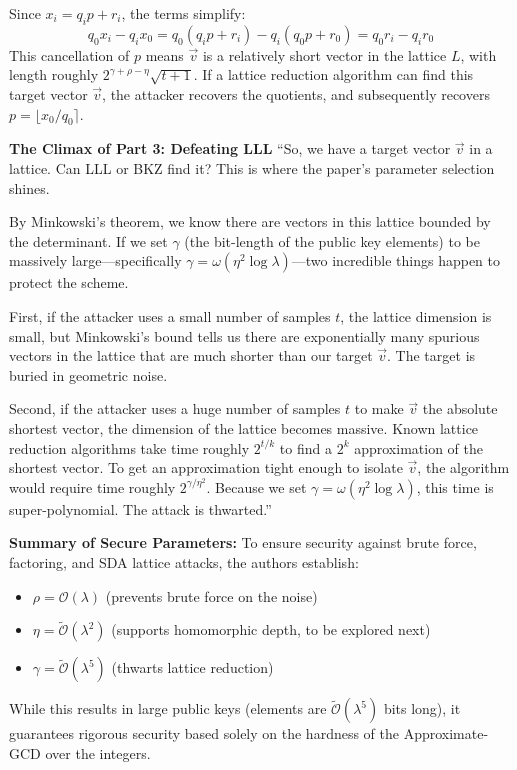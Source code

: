 \documentclass[11pt]{article}
\begin{document}
Since $x_i = q_i p + r_i$, the terms simplify:
\begin{equation}
q_0 x_i - q_i x_0 = q_0(q_i p + r_i) - q_i(q_0 p + r_0) = q_0 r_i - q_i r_0
\end{equation}
This cancellation of $p$ means $\vec{v}$ is a relatively short vector in the lattice $L$, with length roughly $2^{\gamma + \rho - \eta} \sqrt{t+1}$. If a lattice reduction algorithm can find this target vector $\vec{v}$, the attacker recovers the quotients, and subsequently recovers $p = \lfloor x_0 / q_0 \rceil$.

\begin{speakernote}
\textbf{The Climax of Part 3: Defeating LLL}
``So, we have a target vector $\vec{v}$ in a lattice. Can LLL or BKZ find it? This is where the paper's parameter selection shines. 

By Minkowski's theorem, we know there are vectors in this lattice bounded by the determinant. If we set $\gamma$ (the bit-length of the public key elements) to be massively large—specifically $\gamma = \omega(\eta^2 \log \lambda)$—two incredible things happen to protect the scheme.

First, if the attacker uses a small number of samples $t$, the lattice dimension is small, but Minkowski's bound tells us there are exponentially many spurious vectors in the lattice that are much shorter than our target $\vec{v}$. The target is buried in geometric noise.

Second, if the attacker uses a huge number of samples $t$ to make $\vec{v}$ the absolute shortest vector, the dimension of the lattice becomes massive. Known lattice reduction algorithms take time roughly $2^{t/k}$ to find a $2^k$ approximation of the shortest vector. To get an approximation tight enough to isolate $\vec{v}$, the algorithm would require time roughly $2^{\gamma/\eta^2}$. Because we set $\gamma = \omega(\eta^2 \log \lambda)$, this time is super-polynomial. The attack is thwarted.''
\end{speakernote}

\textbf{Summary of Secure Parameters:} To ensure security against brute force, factoring, and SDA lattice attacks, the authors establish:
\begin{itemize}
    \item $\rho = \mathcal{O}(\lambda)$ (prevents brute force on the noise)
    \item $\eta = \tilde{\mathcal{O}}(\lambda^2)$ (supports homomorphic depth, to be explored next)
    \item $\gamma = \tilde{\mathcal{O}}(\lambda^5)$ (thwarts lattice reduction)
\end{itemize}
While this results in large public keys (elements are $\tilde{\mathcal{O}}(\lambda^5)$ bits long), it guarantees rigorous security based solely on the hardness of the Approximate-GCD over the integers.
\end{document}
